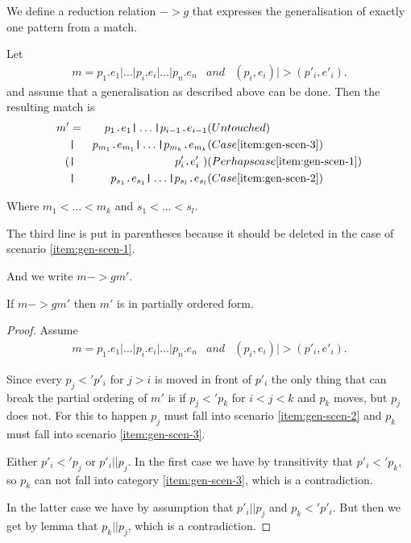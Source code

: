 \begin{definition}[Generalisation, $->g$]
\label{def:gener-match}
  We define a reduction relation $->g$ that expresses the
  generalisation of exactly one pattern from a match.

  Let
  \begin{eqnarray*}[rqTcql]
    m = p_1 \texttt{.} e_1 \texttt{|} \ldots \texttt{|} p_i \texttt{.} e_i
    \texttt{|} \ldots \texttt{|} p_n \texttt{.} e_n & and & (p_i, e_i) |> (p'_i,
    e'_i).
  \end{eqnarray*}
  and assume that a generalisation as described above can be done. Then the
  resulting match is
  \begin{eqnarray*}[rclqqqTl]
    m' &=& p_1 \texttt{.} e_1 \texttt{|} \ldots \texttt{|} p_{i-1} \texttt{.}
    e_{i-1} & (Untouched)\label{eq:gen-1}\\
    &\texttt{|}& p_{m_1} \texttt{.} e_{m_1} \texttt{|} \ldots \texttt{|} p_{m_k}
    \texttt{.} e_{m_k} & (Case \ref{item:gen-scen-3})\label{eq:gen-2}\\
    (&\texttt{|}& p'_i \texttt{.} e'_i \ ) & (Perhaps case \ref{item:gen-scen-1})\label{eq:gen-3}\\
    &\texttt{|}& p_{s_1} \texttt{.} e_{s_1} \texttt{|} \ldots \texttt{|} p_{s_l}
    \texttt{.} e_{s_l} & (Case \ref{item:gen-scen-2})\label{eq:gen-4}
  \end{eqnarray*}

  Where $m_1 < \ldots < m_k$ and $s_1 < \ldots < s_l$.

  The third line is put in parentheses because it should be deleted in the case
  of scenario \ref{item:gen-scen-1}.

  And we write $m ->g m'$.

  \begin{lemma}
    If $m ->g m'$ then $m'$ is in partially ordered form.
  \end{lemma}
  \begin{proof}
    Assume
    \begin{eqnarray*}[rqTcql]
      m = p_1 \texttt{.} e_1 \texttt{|} \ldots \texttt{|} p_i \texttt{.} e_i
      \texttt{|} \ldots \texttt{|} p_n \texttt{.} e_n & and & (p_i, e_i) |> (p'_i,
      e'_i).
    \end{eqnarray*}

    Since every $p_j <' p'_i$ for $j > i$ is moved in front of $p'_i$ the only
    thing that can break the partial ordering of $m'$ is if $p_j <' p_k$ for
    $i < j < k$ and $p_k$ moves, but $p_j$ does not. For this to happen $p_j$
    must fall into scenario \ref{item:gen-scen-2} and $p_k$ must fall into
    scenario \ref{item:gen-scen-3}.

    Either $p'_i <' p_j$ or $p'_i || p_j$. In the first case we have by
    transitivity that $p'_i <' p_k$, so $p_k$ can not fall into category
    \ref{item:gen-scen-3}, which is a contradiction.

    In the latter case we have by assumption that $p'_i || p_j$ and $p_k <'
    p'_i$. But then we get by lemma  that $p_k
    || p_j$, which is a contradiction.
  \end{proof}

\end{definition}

